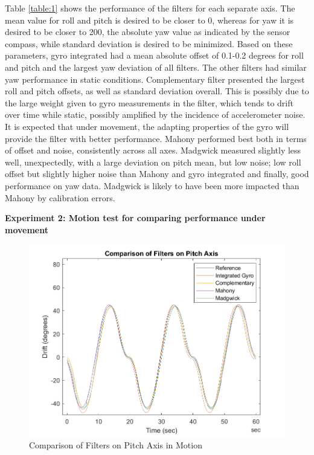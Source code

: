 Table \ref{table:1} shows the performance of the filters for each separate axis. The mean value for roll and pitch is desired to be closer to 0, whereas for yaw it is desired to be closer to 200, the absolute yaw value as indicated by the sensor compass, while standard deviation is desired to be minimized. Based on these parameters, gyro integrated had a mean absolute offset of 0.1-0.2 degrees for roll and pitch and the largest yaw deviation of all filters. The other filters had similar yaw performance in static conditions. Complementary filter presented the largest roll and pitch offsets, as well as standard deviation overall. This is possibly due to the large weight given to gyro measurements in the filter, which tends to drift over time while static, possibly amplified by the incidence of accelerometer noise. It is expected that under movement, the adapting properties of the gyro will provide the filter with better performance. Mahony performed best both in terms of offset and noise, consistently across all axes. Madgwick measured slightly less well, unexpectedly, with a large deviation on pitch mean, but low noise; low roll offset but slightly higher noise than Mahony and gyro integrated and finally, good performance on yaw data. Madgwick is likely to have been more impacted  than Mahony by calibration errors. 


\textbf{Experiment 2: Motion test for comparing performance under movement}

\begin{figure}[H]
    \centering
    \includegraphics[scale=1]{graphics/Navigation/CombinedMotionPitch.png}
    \caption{Comparison of Filters on Pitch Axis in Motion}
     \label{fig:Comparison of Filters on Pitch Axis in Motion}
\end{figure} 

